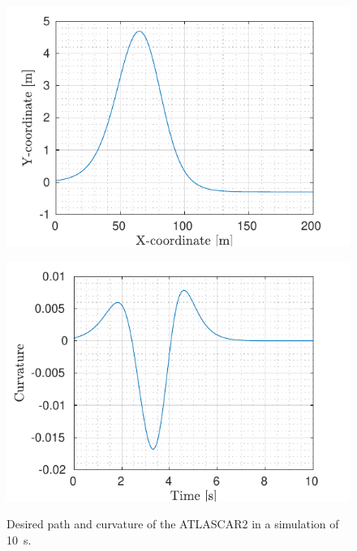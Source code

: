\begin{figure}[!t]
	\centering
	\begin{minipage}[t]{0.49\textwidth}
		\includegraphics[width=\textwidth]{../../MATLAB/lane_following_curve/figure/Reference_curve.pdf}
		\subcaption{}
		\label{fig:reference_laneFollowing_curve}
	\end{minipage}
	\begin{minipage}[t]{0.49\textwidth}
		\includegraphics[width=\textwidth]{../../MATLAB/lane_following_curve/figure/Curvature_curve.pdf}
		\subcaption{}
		\label{fig:curvature_laneFollowing_curve}
	\end{minipage}
	\caption{Desired path and curvature of the ATLASCAR2 in a simulation of \SI{10}{s}.}
	\label{fig:laneFollowing_desired_curve}
\end{figure}

